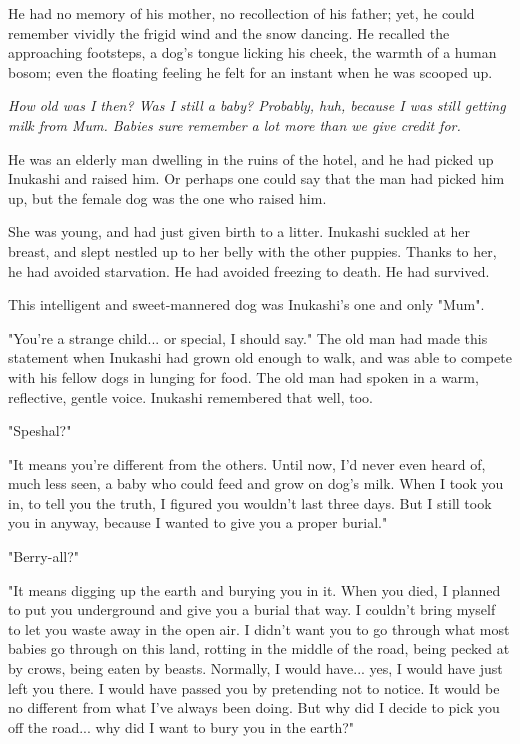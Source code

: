 He had no memory of his mother, no recollection of his father; yet, he
could remember vividly the frigid wind and the snow dancing. He recalled
the approaching footsteps, a dog's tongue licking his cheek, the warmth
of a human bosom; even the floating feeling he felt for an instant when
he was scooped up.

\emph{How old was I then? Was I still a baby? Probably, huh, because I was
still getting milk from Mum. Babies sure remember a lot more than we
give credit for.}

He was an elderly man dwelling in the ruins of the hotel, and he had
picked up Inukashi and raised him. Or perhaps one could say that the man
had picked him up, but the female dog was the one who raised him.

She was young, and had just given birth to a litter. Inukashi suckled at
her breast, and slept nestled up to her belly with the other puppies.
Thanks to her, he had avoided starvation. He had avoided freezing to
death. He had survived.

This intelligent and sweet-mannered dog was Inukashi's one and only
"Mum".

"You're a strange child... or special, I should say." The old man had
made this statement when Inukashi had grown old enough to walk, and was
able to compete with his fellow dogs in lunging for food. The old man
had spoken in a warm, reflective, gentle voice. Inukashi remembered that
well, too.

"Speshal?"

"It means you're different from the others. Until now, I'd never even
heard of, much less seen, a baby who could feed and grow on dog's milk.
When I took you in, to tell you the truth, I figured you wouldn't last
three days. But I still took you in anyway, because I wanted to give you
a proper burial."

"Berry-all?"

"It means digging up the earth and burying you in it. When you died, I
planned to put you underground and give you a burial that way. I
couldn't bring myself to let you waste away in the open air. I didn't
want you to go through what most babies go through on this land, rotting
in the middle of the road, being pecked at by crows, being eaten by
beasts. Normally, I would have... yes, I would have just left you there.
I would have passed you by pretending not to notice. It would be no
different from what I've always been doing. But why did I decide to pick
you off the road... why did I want to bury you in the earth?"

